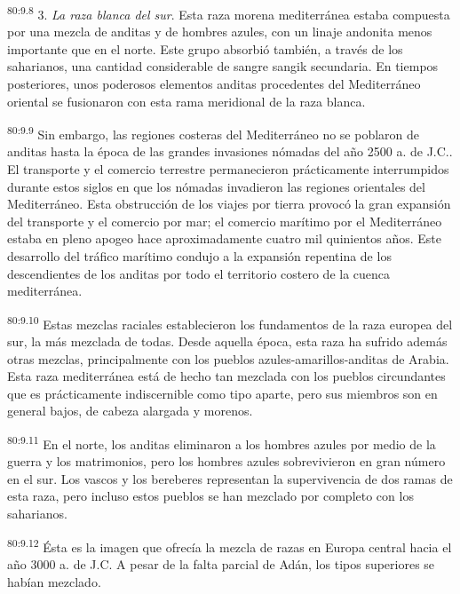 \par
\textsuperscript{80:9.8} 3. \textit{La raza blanca del sur}. Esta raza morena mediterránea estaba compuesta por una mezcla de anditas y de hombres azules, con un linaje andonita menos importante que en el norte. Este grupo absorbió también, a través de los saharianos, una cantidad considerable de sangre sangik secundaria. En tiempos posteriores, unos poderosos elementos anditas procedentes del Mediterráneo oriental se fusionaron con esta rama meridional de la raza blanca.

\par
\textsuperscript{80:9.9} Sin embargo, las regiones costeras del Mediterráneo no se poblaron de anditas hasta la época de las grandes invasiones nómadas del año 2500 a. de J.C.. El transporte y el comercio terrestre permanecieron prácticamente interrumpidos durante estos siglos en que los nómadas invadieron las regiones orientales del Mediterráneo. Esta obstrucción de los viajes por tierra provocó la gran expansión del transporte y el comercio por mar; el comercio marítimo por el Mediterráneo estaba en pleno apogeo hace aproximadamente cuatro mil quinientos años. Este desarrollo del tráfico marítimo condujo a la expansión repentina de los descendientes de los anditas por todo el territorio costero de la cuenca mediterránea.

\par
\textsuperscript{80:9.10} Estas mezclas raciales establecieron los fundamentos de la raza europea del sur, la más mezclada de todas. Desde aquella época, esta raza ha sufrido además otras mezclas, principalmente con los pueblos azules-amarillos-anditas de Arabia. Esta raza mediterránea está de hecho tan mezclada con los pueblos circundantes que es prácticamente indiscernible como tipo aparte, pero sus miembros son en general bajos, de cabeza alargada y morenos.

\par
\textsuperscript{80:9.11} En el norte, los anditas eliminaron a los hombres azules por medio de la guerra y los matrimonios, pero los hombres azules sobrevivieron en gran número en el sur. Los vascos y los bereberes representan la supervivencia de dos ramas de esta raza, pero incluso estos pueblos se han mezclado por completo con los saharianos.

\par
\textsuperscript{80:9.12} Ésta es la imagen que ofrecía la mezcla de razas en Europa central hacia el año 3000 a. de J.C. A pesar de la falta parcial de Adán, los tipos superiores se habían mezclado.

